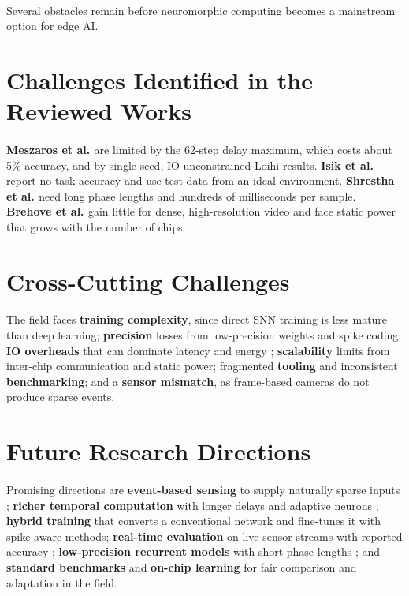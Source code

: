 \documentclass[12pt,a4paper,final]{extreport}
\begin{document}
\paragraph{} Several obstacles remain before neuromorphic computing becomes a mainstream option for edge AI.

\section{Challenges Identified in the Reviewed Works}

\paragraph{} \textbf{Meszaros et al. \cite{p1}} are limited by the 62-step delay maximum, which costs about 5\% accuracy, and by single-seed, IO-unconstrained Loihi results. \textbf{Isik et al. \cite{p2}} report no task accuracy and use test data from an ideal environment. \textbf{Shrestha et al. \cite{p3}} need long phase lengths and hundreds of milliseconds per sample. \textbf{Brehove et al. \cite{p4}} gain little for dense, high-resolution video and face static power that grows with the number of chips.

\section{Cross-Cutting Challenges}

\paragraph{} The field faces \textbf{training complexity}, since direct SNN training is less mature than deep learning; \textbf{precision} losses from low-precision weights and spike coding; \textbf{IO overheads} that can dominate latency and energy \cite{p4}; \textbf{scalability} limits from inter-chip communication and static power; fragmented \textbf{tooling} and inconsistent \textbf{benchmarking}; and a \textbf{sensor mismatch}, as frame-based cameras do not produce sparse events.

\section{Future Research Directions}

\paragraph{} Promising directions are \textbf{event-based sensing} to supply naturally sparse inputs \cite{p4}; \textbf{richer temporal computation} with longer delays and adaptive neurons \cite{p1}; \textbf{hybrid training} that converts a conventional network and fine-tunes it with spike-aware methods; \textbf{real-time evaluation} on live sensor streams with reported accuracy \cite{p2}; \textbf{low-precision recurrent models} with short phase lengths \cite{p3}; and \textbf{standard benchmarks} and \textbf{on-chip learning} for fair comparison and adaptation in the field.
\end{document}
